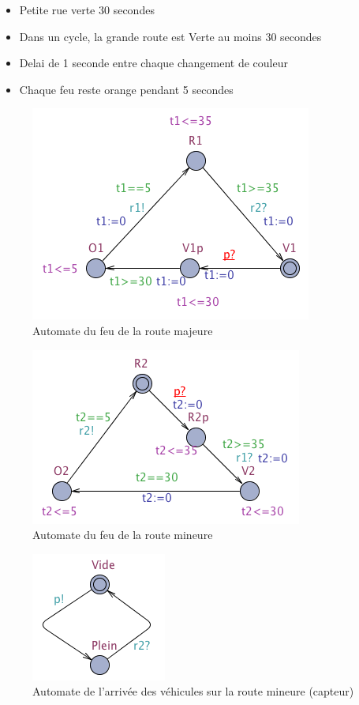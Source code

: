 \documentclass[11pt]{article}
\begin{document}

\begin{itemize}
	\item Petite rue verte 30 secondes
	\item Dans un cycle, la grande route est Verte au moins 30 secondes
	\item Delai de 1 seconde entre chaque changement de couleur
	\item Chaque feu reste orange pendant 5 secondes
\end{itemize}

\begin{figure}[H]
	\centering
	\includegraphics{ressources/part3/Q10-1.png}
	\caption{Automate du feu de la route majeure}
\end{figure}

\begin{figure}[H]
	\centering
	\includegraphics{ressources/part3/Q10-2.png}
	\caption{Automate du feu de la route mineure}
\end{figure}

\begin{figure}[H]
	\centering
	\includegraphics{ressources/part3/Q10-3.png}
	\caption{Automate de l'arrivée des véhicules sur la route mineure (capteur)}
\end{figure}
\end{document}
